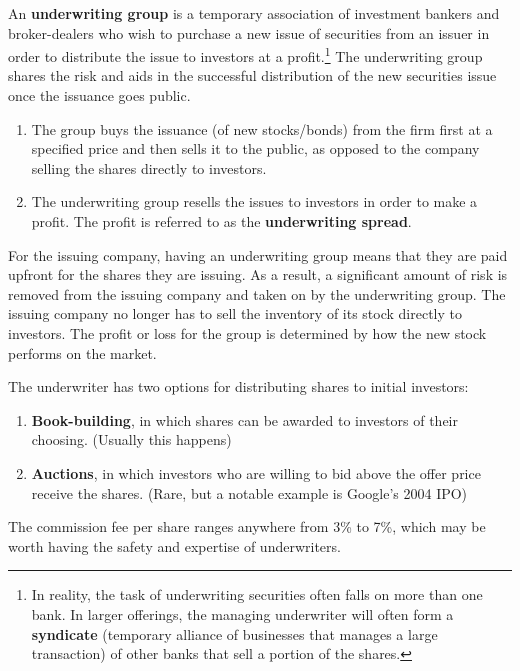 \documentclass{article}
\begin{document}
    \begin{definition}[Underwriters]
      An \textbf{underwriting group} is a temporary association of investment bankers and broker-dealers who wish to purchase a new issue of securities from an issuer in order to distribute the issue to investors at a profit.\footnote{In reality, the task of underwriting securities often falls on more than one bank. In larger offerings, the managing underwriter will often form a \textbf{syndicate} (temporary alliance of businesses that manages a large transaction) of other banks that sell a portion of the shares. } The underwriting group shares the risk and aids in the successful distribution of the new securities issue once the issuance goes public. 
      \begin{enumerate}
        \item The group buys the issuance (of new stocks/bonds) from the firm first at a specified price and then sells it to the public, as opposed to the company selling the shares directly to investors. 
        \item The underwriting group resells the issues to investors in order to make a profit. The profit is referred to as the \textbf{underwriting spread}. 
      \end{enumerate}
      For the issuing company, having an underwriting group means that they are paid upfront for the shares they are issuing. As a result, a significant amount of risk is removed from the issuing company and taken on by the underwriting group. The issuing company no longer has to sell the inventory of its stock directly to investors. The profit or loss for the group is determined by how the new stock performs on the market. 

      The underwriter has two options for distributing shares to initial investors: 
      \begin{enumerate}
        \item \textbf{Book-building}, in which shares can be awarded to investors of their choosing. (Usually this happens) 
        \item \textbf{Auctions}, in which investors who are willing to bid above the offer price receive the shares. (Rare, but a notable example is Google's 2004 IPO)
      \end{enumerate}
      The commission fee per share ranges anywhere from 3\% to 7\%, which may be worth having the safety and expertise of underwriters. 
    \end{definition}
\end{document}
